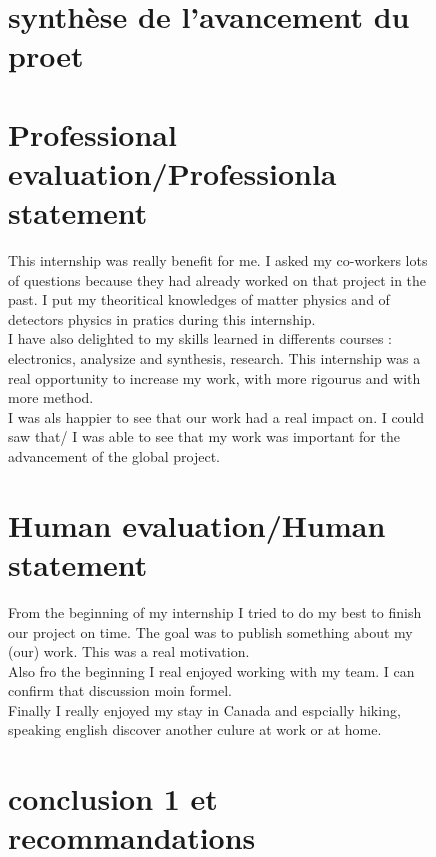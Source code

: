 \documentclass[a4paper, 11pt]{report}%
\begin{document}
\begin{figure}[!hbtp]
  
  \chapter{synthèse de l'avancement du proet}


  \chapter{Professional evaluation/Professionla statement}
  
  This internship was really benefit for me. I asked my co-workers 
  lots of questions because they had already worked on that project in the past. 
  I put my theoritical knowledges of matter physics and of detectors physics in pratics during 
  this internship. 
  \\
  
  I have also delighted to my skills learned in differents courses : 
  electronics, analysize and synthesis, research. This internship was 
  a real opportunity to increase my work, with more rigourus and with more method. 
  \\
  
  I was als happier to see that our work had a real impact on. I could saw that/ 
  I was able to see that my work was important for the advancement of the global project. 
  
  \chapter{Human evaluation/Human statement}
  
  From the beginning of my internship I tried to do my best to finish our project on time. 
  The goal was to publish something about my (our) work. This was a real motivation. 
  \\
  
  Also fro the beginning I real enjoyed working with my team. I can confirm that
  discussion moin formel. 
  \\
  
  Finally I really enjoyed my stay in Canada and espcially hiking, speaking english
 discover another culure at work or at home. 
 
 \chapter{conclusion 1 et recommandations}
  
  \\
  

\end{figure}
\end{document}
